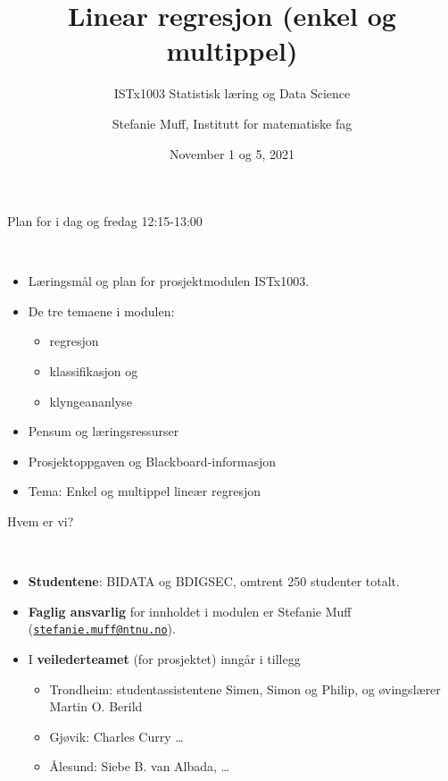 \documentclass[10pt,ignorenonframetext,]{beamer}
\title{Linear regresjon (enkel og multippel)}
\subtitle{ISTx1003 Statistisk læring og Data Science}
\author{Stefanie Muff, Institutt for matematiske fag}
\date{November 1 og 5, 2021}
\providecommand{\tightlist}{%
  \setlength{\itemsep}{0pt}\setlength{\parskip}{0pt}}
\begin{document}
\frame{\titlepage}

\begin{frame}{Plan for i dag og fredag 12:15-13:00}
\protect\hypertarget{plan-for-i-dag-og-fredag-1215-1300}{}

\(~\)

\begin{itemize}
\item
  Læringsmål og plan for prosjektmodulen ISTx1003.
\item
  De tre temaene i modulen:

  \begin{itemize}
  \tightlist
  \item
    regresjon
  \item
    klassifikasjon og
  \item
    klyngeananlyse
  \end{itemize}
\item
  Pensum og læringsressurser
\item
  Prosjektoppgaven og Blackboard-informasjon
\item
  Tema: Enkel og multippel lineær regresjon
\end{itemize}

\end{frame}

\begin{frame}{Hvem er vi?}
\protect\hypertarget{hvem-er-vi}{}

\(~\)

\begin{itemize}
\item
  \textbf{Studentene}: BIDATA og BDIGSEC, omtrent 250 studenter totalt.
\item
  \textbf{Faglig ansvarlig} for innholdet i modulen er Stefanie Muff
  (\href{mailto:stefanie.muff@ntnu.no}{\nolinkurl{stefanie.muff@ntnu.no}}).
\item
  I \textbf{veilederteamet} (for prosjektet) inngår i tillegg

  \begin{itemize}
  \tightlist
  \item
    Trondheim: studentassistentene Simen, Simon og Philip, og
    øvingslærer Martin O. Berild
  \item
    Gjøvik: Charles Curry \ldots{}
  \item
    Ålesund: Siebe B. van Albada, \ldots{}
  \end{itemize}
\end{itemize}

\end{frame}
\end{document}
